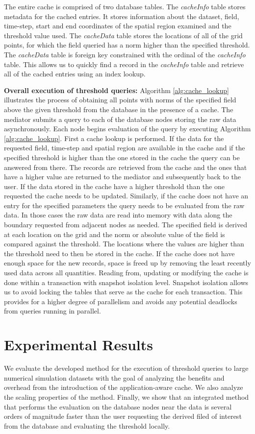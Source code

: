 \documentclass{sig-alternate}
\begin{document}
The entire cache is comprised of two database tables. The {\it cacheInfo} table stores metadata for the cached entries. It stores information about the
dataset, field, time-step, start and end coordinates of the spatial region examined and the threshold value used. The {\it cacheData} table stores the locations
of all of the grid points, for which the field queried has a norm higher than the specified threshold. The {\it cacheData} table is foreign key constrained with
the ordinal of the {\it cacheInfo} table. This allows us to quickly find a record in the {\it cacheInfo} table and retrieve all of the cached entries using an index
lookup.

{\bf Overall execution of threshold queries:} Algorithm \ref{alg:cache_lookup} illustrates the process of obtaining all points with norms of the specified field
above the given threshold from the database in the presence of a cache. 
The mediator submits a query to each of the database nodes storing the raw data
asynchronously. Each node begins evaluation of the query by executing Algorithm \ref{alg:cache_lookup}. 
First a cache lookup is performed.
If the data for the requested field, time-step and spatial region
are available in the cache and if the specified threshold is higher than the one stored in the cache the query can be answered from there. The records are
retrieved from the cache and the ones that have a higher value are returned to the mediator and subsequently back to the user. If the data stored in the
cache have a higher threshold than the one requested the cache needs to be updated. Similarly, if the cache does not have an entry for the specified 
parameters the query needs to be evaluated from the raw data. In those cases the raw data are read into memory with data along the boundary requested
from adjacent nodes as needed. The specified field is derived at each location on the grid and the norm or absolute value of the field is
compared against the threshold. The locations where the values are higher than the threshold need to then be stored in the cache. If the cache does not
have enough space for the new records, space is freed up by removing the least recently used data across all quantities. Reading from, updating or
modifying the cache is done within a transaction with snapshot isolation level. Snapshot isolation allows us to avoid locking the tables that serve as the 
cache for each transaction. This provides for a higher degree of parallelism and avoids any potential deadlocks from queries running in parallel.

\section{Experimental Results}
We evaluate the developed method for the execution of threshold queries to large numerical simulation datasets with the goal of analyzing the 
benefits and overhead from the introduction of the application-aware cache. We also analyze the scaling properties of the method. Finally, we show
that an integrated method that performs the evaluation on the database nodes near the data is several orders of magnitude faster than the
user requesting the derived filed of interest from the database and evaluating the threshold locally.
\end{document}
